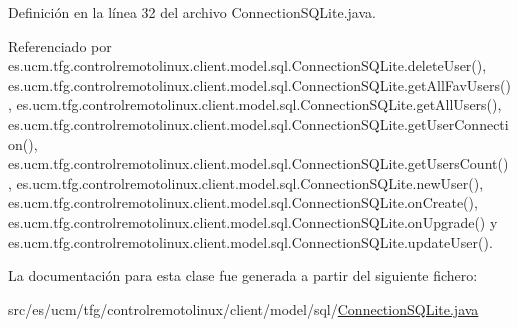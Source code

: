Definición en la línea 32 del archivo Connection\-S\-Q\-Lite.\-java.



Referenciado por es.\-ucm.\-tfg.\-controlremotolinux.\-client.\-model.\-sql.\-Connection\-S\-Q\-Lite.\-delete\-User(), es.\-ucm.\-tfg.\-controlremotolinux.\-client.\-model.\-sql.\-Connection\-S\-Q\-Lite.\-get\-All\-Fav\-Users(), es.\-ucm.\-tfg.\-controlremotolinux.\-client.\-model.\-sql.\-Connection\-S\-Q\-Lite.\-get\-All\-Users(), es.\-ucm.\-tfg.\-controlremotolinux.\-client.\-model.\-sql.\-Connection\-S\-Q\-Lite.\-get\-User\-Connection(), es.\-ucm.\-tfg.\-controlremotolinux.\-client.\-model.\-sql.\-Connection\-S\-Q\-Lite.\-get\-Users\-Count(), es.\-ucm.\-tfg.\-controlremotolinux.\-client.\-model.\-sql.\-Connection\-S\-Q\-Lite.\-new\-User(), es.\-ucm.\-tfg.\-controlremotolinux.\-client.\-model.\-sql.\-Connection\-S\-Q\-Lite.\-on\-Create(), es.\-ucm.\-tfg.\-controlremotolinux.\-client.\-model.\-sql.\-Connection\-S\-Q\-Lite.\-on\-Upgrade() y es.\-ucm.\-tfg.\-controlremotolinux.\-client.\-model.\-sql.\-Connection\-S\-Q\-Lite.\-update\-User().



La documentación para esta clase fue generada a partir del siguiente fichero\-:\begin{DoxyCompactItemize}
\item 
src/es/ucm/tfg/controlremotolinux/client/model/sql/\hyperlink{ConnectionSQLite_8java}{Connection\-S\-Q\-Lite.\-java}\end{DoxyCompactItemize}
